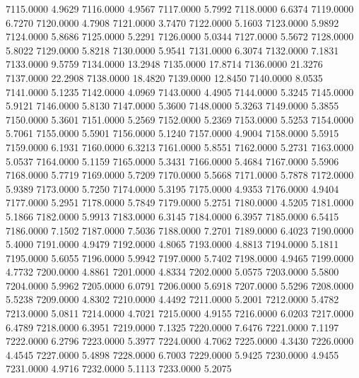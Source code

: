 7115.0000      4.9629
7116.0000      4.9567
7117.0000      5.7992
7118.0000      6.6374
7119.0000      6.7270
7120.0000      4.7908
7121.0000      3.7470
7122.0000      5.1603
7123.0000      5.9892
7124.0000      5.8686
7125.0000      5.2291
7126.0000      5.0344
7127.0000      5.5672
7128.0000      5.8022
7129.0000      5.8218
7130.0000      5.9541
7131.0000      6.3074
7132.0000      7.1831
7133.0000      9.5759
7134.0000     13.2948
7135.0000     17.8714
7136.0000     21.3276
7137.0000     22.2908
7138.0000     18.4820
7139.0000     12.8450
7140.0000      8.0535
7141.0000      5.1235
7142.0000      4.0969
7143.0000      4.4905
7144.0000      5.3245
7145.0000      5.9121
7146.0000      5.8130
7147.0000      5.3600
7148.0000      5.3263
7149.0000      5.3855
7150.0000      5.3601
7151.0000      5.2569
7152.0000      5.2369
7153.0000      5.5253
7154.0000      5.7061
7155.0000      5.5901
7156.0000      5.1240
7157.0000      4.9004
7158.0000      5.5915
7159.0000      6.1931
7160.0000      6.3213
7161.0000      5.8551
7162.0000      5.2731
7163.0000      5.0537
7164.0000      5.1159
7165.0000      5.3431
7166.0000      5.4684
7167.0000      5.5906
7168.0000      5.7719
7169.0000      5.7209
7170.0000      5.5668
7171.0000      5.7878
7172.0000      5.9389
7173.0000      5.7250
7174.0000      5.3195
7175.0000      4.9353
7176.0000      4.9404
7177.0000      5.2951
7178.0000      5.7849
7179.0000      5.2751
7180.0000      4.5205
7181.0000      5.1866
7182.0000      5.9913
7183.0000      6.3145
7184.0000      6.3957
7185.0000      6.5415
7186.0000      7.1502
7187.0000      7.5036
7188.0000      7.2701
7189.0000      6.4023
7190.0000      5.4000
7191.0000      4.9479
7192.0000      4.8065
7193.0000      4.8813
7194.0000      5.1811
7195.0000      5.6055
7196.0000      5.9942
7197.0000      5.7402
7198.0000      4.9465
7199.0000      4.7732
7200.0000      4.8861
7201.0000      4.8334
7202.0000      5.0575
7203.0000      5.5800
7204.0000      5.9962
7205.0000      6.0791
7206.0000      5.6918
7207.0000      5.5296
7208.0000      5.5238
7209.0000      4.8302
7210.0000      4.4492
7211.0000      5.2001
7212.0000      5.4782
7213.0000      5.0811
7214.0000      4.7021
7215.0000      4.9155
7216.0000      6.0203
7217.0000      6.4789
7218.0000      6.3951
7219.0000      7.1325
7220.0000      7.6476
7221.0000      7.1197
7222.0000      6.2796
7223.0000      5.3977
7224.0000      4.7062
7225.0000      4.3430
7226.0000      4.4545
7227.0000      5.4898
7228.0000      6.7003
7229.0000      5.9425
7230.0000      4.9455
7231.0000      4.9716
7232.0000      5.1113
7233.0000      5.2075
